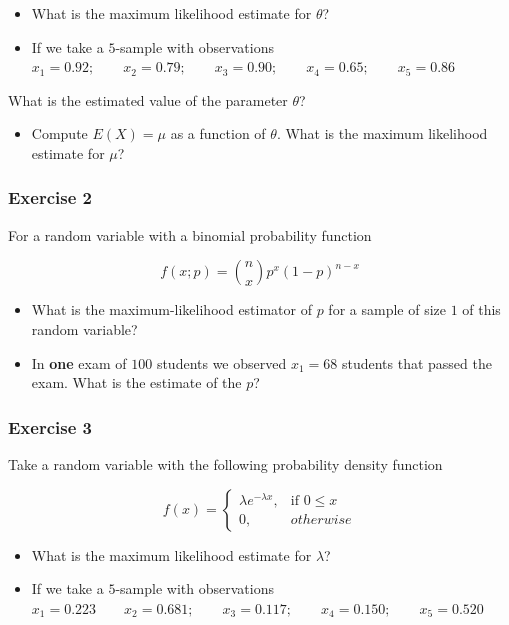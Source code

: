 \documentclass[
]{book}
\providecommand{\tightlist}{%
  \setlength{\itemsep}{0pt}\setlength{\parskip}{0pt}}
\begin{document}
\begin{itemize}
\item
  What is the maximum likelihood estimate for \(\theta\)?
\item
  If we take a \(5\)-sample with observations
  \(x_1 = 0.92; \qquad x_2 = 0.79; \qquad x_3 = 0.90; \qquad x_4 = 0.65; \qquad x_5 = 0.86\)
\end{itemize}

What is the estimated value of the parameter \(\theta\)?

\begin{itemize}
\tightlist
\item
  Compute \(E(X)=\mu\) as a function of \(\theta\). What is the maximum likelihood estimate for \(\mu\)?
\end{itemize}

\hypertarget{exercise-2-9}{%
\subsubsection{Exercise 2}\label{exercise-2-9}}

For a random variable with a binomial probability function

\[f(x; p)=\binom n x p^x(1-p)^{n-x}\]

\begin{itemize}
\item
  What is the maximum-likelihood estimator of \(p\) for a sample of size \(1\) of this random variable?
\item
  In \textbf{one} exam of \(100\) students we observed \(x_1=68\) students that passed the exam. What is the estimate of the \(p\)?
\end{itemize}

\hypertarget{exercise-3-6}{%
\subsubsection{Exercise 3}\label{exercise-3-6}}

Take a random variable with the following probability density function

\[
    f(x)= 
\begin{cases}
    \lambda e^{-\lambda x},& \text{if } 0 \leq x\\
    0,& otherwise 
\end{cases}
\]

\begin{itemize}
\item
  What is the maximum likelihood estimate for \(\lambda\)?
\item
  If we take a \(5\)-sample with observations
  \(x_1 = 0.223 \qquad x_2 = 0.681; \qquad x_3 = 0.117; \qquad x_4 = 0.150; \qquad x_5 = 0.520\)
\end{itemize}
\end{document}
